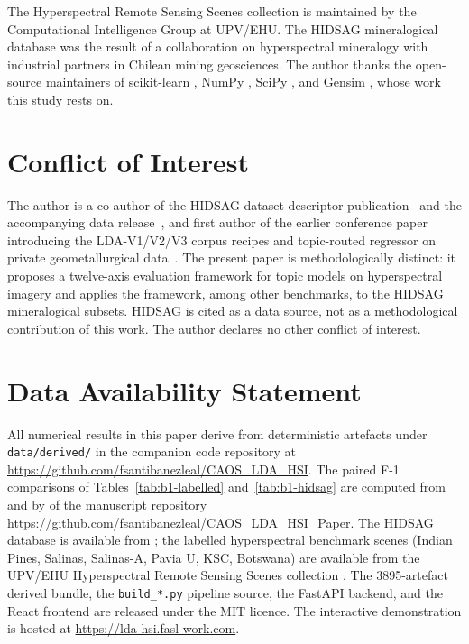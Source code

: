 \documentclass[journal,a4paper,10pt]{IEEEtran}
\begin{document}
The Hyperspectral Remote Sensing Scenes collection is maintained by
the Computational Intelligence Group at UPV/EHU. The HIDSAG
mineralogical database was the result of a collaboration on
hyperspectral mineralogy with industrial partners in Chilean mining
geosciences. The author thanks the open-source maintainers of
scikit-learn \cite{pedregosa2011scikit}, NumPy \cite{harris2020numpy},
SciPy \cite{virtanen2020scipy}, and Gensim \cite{rehurek2010gensim},
whose work this study rests on.

\section*{Conflict of Interest}

The author is a co-author of the HIDSAG dataset descriptor
publication~\cite{hidsag2023} and the accompanying data
release~\cite{hidsag2023figshare}, and first author of the
earlier conference paper introducing the LDA-V1/V2/V3 corpus
recipes and topic-routed regressor on private geometallurgical
data~\cite{santibanezleal2022procemin}. The present paper
is methodologically distinct: it proposes a twelve-axis evaluation
framework for topic models on hyperspectral imagery and applies
the framework, among other benchmarks, to the HIDSAG mineralogical
subsets. HIDSAG is cited as a data source, not as a methodological
contribution of this work. The author declares no other conflict
of interest.

\section*{Data Availability Statement}

All numerical results in this paper derive from deterministic
artefacts under \texttt{data/derived/} in the companion code
repository at \url{https://github.com/fsantibanezleal/CAOS_LDA_HSI}.
The paired F-1 comparisons of Tables~\ref{tab:b1-labelled}
and~\ref{tab:b1-hidsag} are computed from
 and 
by  of the
manuscript repository
\url{https://github.com/fsantibanezleal/CAOS_LDA_HSI_Paper}.
The HIDSAG database is available from
\cite{hidsag2023figshare}; the labelled hyperspectral benchmark
scenes (Indian Pines, Salinas, Salinas-A, Pavia U, KSC, Botswana)
are available from the UPV/EHU Hyperspectral Remote Sensing Scenes
collection \cite{baumgardner1992indianpines,aviris_salinas,rosis_pavia,aviris_ksc,eo1_botswana}.
The 3895-artefact derived bundle, the
\texttt{build\_*.py} pipeline source, the FastAPI backend, and the
React frontend are released under the MIT licence. The interactive
demonstration is hosted at
\url{https://lda-hsi.fasl-work.com}.



\end{document}
